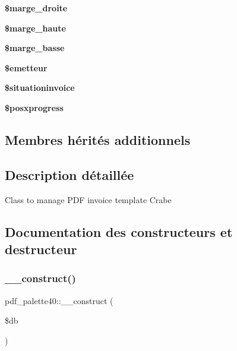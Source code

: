 \begin{DoxyCompactItemize}
\mbox{\label{classpdf__palette40_a297289f551c29224919be1be33bd6eb5}} 
{\bfseries \$marge\+\_\+droite}
\item 
\mbox{\label{classpdf__palette40_ab8e1afadbe9f465948231639c6330c6e}} 
{\bfseries \$marge\+\_\+haute}
\item 
\mbox{\label{classpdf__palette40_a3d4353e05afdaf4742a2c6c7a3cfbb33}} 
{\bfseries \$marge\+\_\+basse}
\item 
\mbox{\label{classpdf__palette40_af609ba2316840f32acb574d624bae61b}} 
{\bfseries \$emetteur}
\item 
\mbox{\label{classpdf__palette40_af8e8bcbda7dbe879b05dc69a7e1b0a97}} 
{\bfseries \$situationinvoice}
\item 
\mbox{\label{classpdf__palette40_a836fcc38dec277e16cf303cb9482af25}} 
{\bfseries \$posxprogress}
\end{DoxyCompactItemize}
\subsection*{Membres hérités additionnels}


\subsection{Description détaillée}
Class to manage P\+DF invoice template Crabe 

\subsection{Documentation des constructeurs et destructeur}
\mbox{\label{classpdf__palette40_a55bd08e699a3e12de75bd4f1ebe01f54}} 
\subsubsection{\texorpdfstring{\+\_\+\+\_\+construct()}{\_\_construct()}\hspace{0.1cm}{\footnotesize\ttfamily [1/2]}}
{\footnotesize\ttfamily pdf\+\_\+palette40\+::\+\_\+\+\_\+construct (\begin{DoxyParamCaption}\item[{}]{\$db }\end{DoxyParamCaption})}

